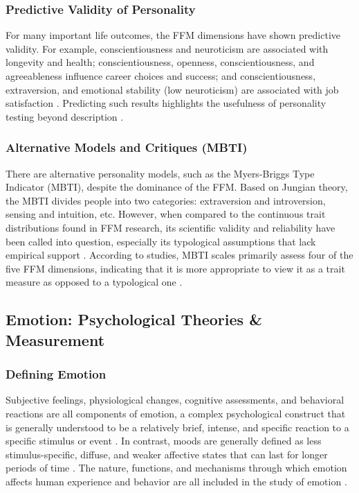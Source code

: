 \documentclass{DESSThesis}
\begin{document}
\subsubsection{Predictive Validity of Personality}
For many important life outcomes, the FFM dimensions have shown predictive validity. For example, conscientiousness and neuroticism are associated with longevity and health; conscientiousness, openness, conscientiousness, and agreeableness influence career choices and success; and conscientiousness, extraversion, and emotional stability (low neuroticism) are associated with job satisfaction \cite{rammstedt_big_2014,kajonius_assessing_2019}. Predicting such results highlights the usefulness of personality testing beyond description \cite{kosinski_private_2013}.

\subsubsection{Alternative Models and Critiques (MBTI)}
There are alternative personality models, such as the Myers-Briggs Type Indicator (MBTI), despite the dominance of the FFM. Based on Jungian theory, the MBTI divides people into two categories: extraversion and introversion, sensing and intuition, etc. However, when compared to the continuous trait distributions found in FFM research, its scientific validity and reliability have been called into question, especially its typological assumptions that lack empirical support \cite{mccrae_reinterpreting_1989,li_influence_2018}. According to studies, MBTI scales primarily assess four of the five FFM dimensions, indicating that it is more appropriate to view it as a trait measure as opposed to a typological one \cite{mccrae_reinterpreting_1989}.

\subsection{Emotion: Psychological Theories \& Measurement}

\subsubsection{Defining Emotion}
Subjective feelings, physiological changes, cognitive assessments, and behavioral reactions are all components of emotion, a complex psychological construct that is generally understood to be a relatively brief, intense, and specific reaction to a specific stimulus or event \cite{barsade_ripple_2002,paul_towards_2020}. In contrast, moods are generally defined as less stimulus-specific, diffuse, and weaker affective states that can last for longer periods of time \cite{barsade_ripple_2002,david_watson_panas-x_1994}. The nature, functions, and mechanisms through which emotion affects human experience and behavior are all included in the study of emotion \cite{lerner_emotion_2015}.
\end{document}
